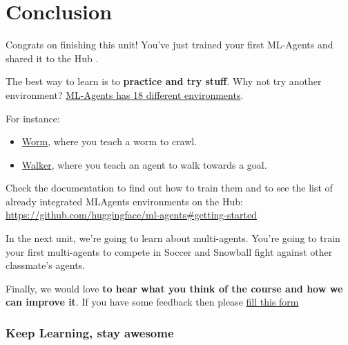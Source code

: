 \documentclass[11pt,a4paper]{article}
\begin{document}
\section{Conclusion}\label{conclusion}

Congrats on finishing this unit! You've just trained your first ML-Agents and shared it to the Hub .

The best way to learn is to \textbf{practice and try stuff}. Why not try another environment? \href{https://github.com/Unity-Technologies/ml-agents/blob/develop/docs/Learning-Environment-Examples.md}{ML-Agents has 18 different environments}.

For instance:

\begin{itemize}
\tightlist
\item
  \href{https://singularite.itch.io/worm}{Worm}, where you teach a worm to crawl.
\item
  \href{https://singularite.itch.io/walker}{Walker}, where you teach an agent to walk towards a goal.
\end{itemize}

Check the documentation to find out how to train them and to see the list of already integrated MLAgents environments on the Hub: \url{https://github.com/huggingface/ml-agents#getting-started}


In the next unit, we're going to learn about multi-agents. You're going to train your first multi-agents to compete in Soccer and Snowball fight against other classmate's agents.


Finally, we would love \textbf{to hear what you think of the course and how we can improve it}. If you have some feedback then please \href{https://forms.gle/BzKXWzLAGZESGNaE9}{fill this form}

\subsubsection{Keep Learning, stay awesome}\label{keep-learning-stay-awesome-1}
\end{document}
